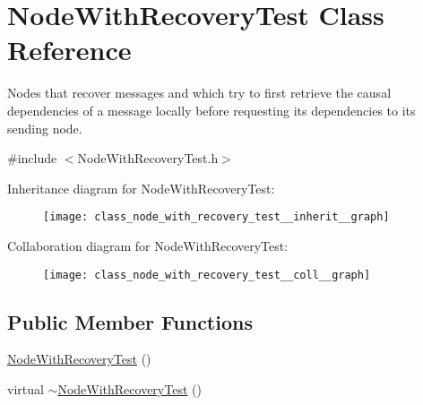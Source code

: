 \hypertarget{class_node_with_recovery_test}{}\section{Node\+With\+Recovery\+Test Class Reference}
\label{class_node_with_recovery_test}


Nodes that recover messages and which try to first retrieve the causal dependencies of a message locally before requesting its dependencies to its sending node.  




{\ttfamily \#include $<$Node\+With\+Recovery\+Test.\+h$>$}



Inheritance diagram for Node\+With\+Recovery\+Test\+:\nopagebreak
\begin{figure}[H]
\begin{center}
\leavevmode
\texttt{[image: class\_node\_with\_recovery\_test\_\_inherit\_\_graph]}
\end{center}
\end{figure}


Collaboration diagram for Node\+With\+Recovery\+Test\+:\nopagebreak
\begin{figure}[H]
\begin{center}
\leavevmode
\texttt{[image: class\_node\_with\_recovery\_test\_\_coll\_\_graph]}
\end{center}
\end{figure}
\subsection*{Public Member Functions}
\begin{DoxyCompactItemize}
\item 
\hyperlink{class_node_with_recovery_test_ae8676a479a3ad761eb6cd5069575f51f}{Node\+With\+Recovery\+Test} ()
\item 
virtual \hyperlink{class_node_with_recovery_test_a91ac9cad83523696aee1a5c5718a62af}{$\sim$\+Node\+With\+Recovery\+Test} ()
\end{DoxyCompactItemize}
